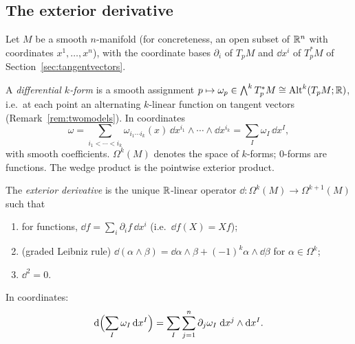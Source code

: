 \subsection{The exterior derivative}\label{sec:dform}
Let $M$ be a smooth $n$-manifold (for concreteness, an open subset of $\mathbb{R}^n$ with coordinates $x^1,\dots,x^n$), with the coordinate bases
$\partial_i$ of $T_pM$ and $\dd x^i$ of $T_p^*M$ of Section~\ref{sec:tangentvectors}.

\begin{definition}
A \emph{differential $k$-form} is a smooth assignment $p\mapsto\omega_p\in\bigwedge^kT_p^*M\cong\mathrm{Alt}^k(T_pM;\mathbb{R})$, i.e.\ at each point an alternating $k$-linear function on tangent vectors (Remark~\ref{rem:twomodels}). In coordinates
\[
 \omega=\sum_{i_1<\cdots<i_k}\omega_{i_1\cdots i_k}(x)\,\dd x^{i_1}\wedge\cdots\wedge\dd x^{i_k}=\sum_I\omega_I\,\dd x^I,
\]
with smooth coefficients. $\Omega^k(M)$ denotes the space of $k$-forms; $0$-forms are functions. The wedge product is the pointwise exterior product.
\end{definition}

\begin{definition}\label{def:d}
The \emph{exterior derivative} is the unique $\mathbb{R}$-linear operator $\dd:\Omega^k(M)\to\Omega^{k+1}(M)$ such that
\begin{enumerate}
  \item for functions, $\dd f=\sum_i\partial_if\,\dd x^i$ (i.e.\ $\dd f(X)=Xf$);
  \item (graded Leibniz rule) $\dd(\alpha\wedge\beta)=\dd\alpha\wedge\beta+(-1)^k\alpha\wedge\dd\beta$ for $\alpha\in\Omega^k$;
  \item $\dd^2=0$.
\end{enumerate}
In coordinates:
\begin{equation}\label{eq:dcoord}
 \dd\Bigl(\sum_I\omega_I\,\dd x^I\Bigr)=\sum_I\sum_{j=1}^n\partial_j\omega_I\;\dd x^j\wedge\dd x^I .
\end{equation}
\end{definition}

